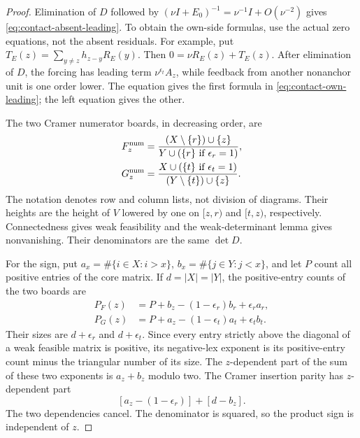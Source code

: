 \documentclass[11pt,a4paper]{amsart}
\numberwithin{equation}{section}
\theoremstyle{plain}
\theoremstyle{definition}
\begin{document}
\begin{proof}
Elimination of \(D\) followed by
\((\nu I+E_0)^{-1}=\nu^{-1}I+O(\nu^{-2})\) gives
\eqref{eq:contact-absent-leading}.  To obtain the own-side formulas, use
the actual zero equations, not the absent residuals.  For example, put
\(T_E(z)=\sum_{y\ne z}h_{z-y}R_E(y)\).
Then \(0=\nu R_E(z)+T_E(z)\).  After elimination of \(D\), the forcing has
leading term \(\nu^{\epsilon_t}A_z\), while feedback from another nonanchor
unit is one order lower.  The equation gives the first formula in
\eqref{eq:contact-own-leading}; the left equation gives the other.

The two Cramer numerator boards, in decreasing order, are
\begin{equation}
\begin{aligned}
 F_z^{\rm num}&=
  \frac{(X\setminus\{r\})\cup\{z\}}
       {Y\cup(\{r\}\text{ if }\epsilon_r=1)},\\
 G_z^{\rm num}&=
  \frac{X\cup(\{t\}\text{ if }\epsilon_t=1)}
       {(Y\setminus\{t\})\cup\{z\}}.
\end{aligned}
 \label{eq:contact-numerator-boards}
\end{equation}
The notation denotes row and column lists, not division of diagrams.
Their heights are the height of \(V\) lowered by one on \([z,r)\) and
\([t,z)\), respectively.  Connectedness gives weak feasibility and the
weak-determinant lemma gives nonvanishing.  Their denominators are the
same \(\det D\).

For the sign, put \(a_x=\#\{i\in X:i>x\}\),
\(b_x=\#\{j\in Y:j<x\}\), and let \(P\) count all positive entries of the
core matrix.  If \(d=|X|=|Y|\), the positive-entry counts of the two boards
are
\begin{align*}
 P_F(z)&=P+b_z-(1-\epsilon_r)b_r+\epsilon_ra_r,\\
 P_G(z)&=P+a_z-(1-\epsilon_t)a_t+\epsilon_tb_t.
\end{align*}
Their sizes are \(d+\epsilon_r\) and \(d+\epsilon_t\).  Since every entry
strictly above the diagonal of a weak feasible matrix is positive, its
negative-lex exponent is its positive-entry count minus the triangular
number of its size.  The \(z\)-dependent part of the sum of these two
exponents is \(a_z+b_z\) modulo two.  The Cramer insertion parity has
\(z\)-dependent part
\[
 [a_z-(1-\epsilon_r)]+[d-b_z].
\]
The two dependencies cancel.  The denominator is squared, so the product
sign is independent of \(z\).


\end{proof}
\end{document}
